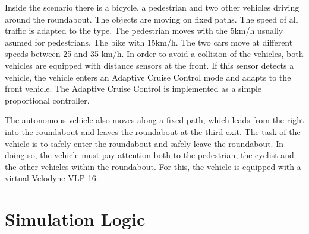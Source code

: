 \documentclass[11pt,oneside,openright]{mpreport}
\begin{document}

Inside the scenario there is a bicycle, a pedestrian and two other vehicles driving around the roundabout. The objects are moving on fixed paths.
The speed of all traffic is adapted to the type. The pedestrian moves with the 5km/h usually asumed for pedestrians.
The bike with 15km/h. The two cars move at different speeds between 25 and 35 km/h. In order to avoid a collision of the vehicles,
both vehicles are equipped with distance sensors at the front. If this sensor detects a vehicle, the vehicle enters an Adaptive Cruise Control mode and adapts to the front vehicle.
The Adaptive Cruise Control is implemented as a simple proportional controller.


The autonomous vehicle also moves along a fixed path, which leads from the right into the roundabout and leaves the roundabout at the third exit. 
The task of the vehicle is to safely enter the roundabout and safely leave the roundabout. In doing so, the vehicle must pay attention both to the pedestrian,
the cyclist and the other vehicles within the roundabout. For this, the vehicle is equipped with a virtual Velodyne VLP-16.

\section{Simulation Logic}
\end{document}
